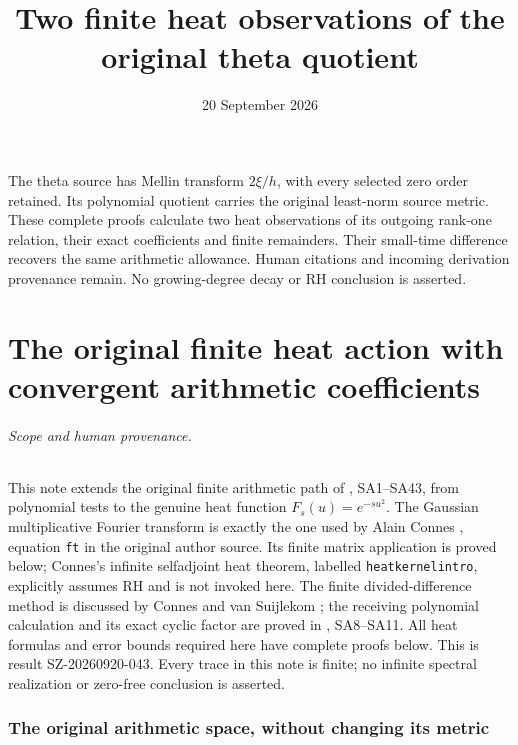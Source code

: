 \documentclass[11pt]{article}
\title{Two finite heat observations of the original theta quotient}
\author{}\date{20 September 2026}
\begin{document}
\maketitle
The theta source has Mellin transform $2\xi/h$, with every selected zero
order retained. Its polynomial quotient carries the original least-norm
source metric. These complete proofs calculate two heat observations of
its outgoing rank-one relation, their exact coefficients and finite
remainders. Their small-time difference recovers the same arithmetic
allowance. Human citations and incoming derivation provenance remain.
No growing-degree decay or RH conclusion is asserted.


\clearpage\begingroup
\part*{The original finite heat action with convergent arithmetic coefficients}
\newcommand{\nhpC}{\mathbb C}\newcommand{\nhpR}{\mathbb R}
\newcommand{\nhptr}{\operatorname{tr}}\newcommand{\nhpdd}{\dagger_G}
\newcommand{\nhpeps}{\epsilon}\newcommand{\nhpspec}{\operatorname{spec}}
\newtheorem{nhptheorem}{Theorem}[section]
\newtheorem{nhplemma}[nhptheorem]{Lemma}


\paragraph{Scope and human provenance.}
This note extends the original finite arithmetic path of
\cite{nhp:NativeAction}, SA1--SA43, from polynomial tests to the
genuine heat function \(F_s(u)=e^{-su^2}\).
The Gaussian multiplicative Fourier transform is exactly the
one used by Alain Connes \cite{nhp:ConnesHeat}, equation
\texttt{ft} in the original author source. Its finite matrix
application is proved below; Connes's infinite selfadjoint
heat theorem, labelled \texttt{heatkernelintro}, explicitly
assumes RH and is not invoked here.
The finite divided-difference method is discussed by Connes
and van Suijlekom \cite{nhp:CV}; the receiving polynomial
calculation and its exact cyclic factor are proved in
\cite{nhp:NativeAction}, SA8--SA11. All heat formulas and error
bounds required here have complete proofs below.
This is result SZ-20260920-043. Every trace in this note is
finite; no infinite spectral realization or zero-free
conclusion is asserted.

\section{The original arithmetic space, without changing its metric}
\end{document}
